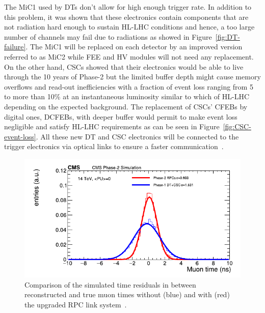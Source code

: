 	The \acf{MiC1} used by DTs don't allow for high enough trigger rate. In addition to this problem, it was shown that these electronics contain components that are not radiation hard enough to sustain HL-LHC conditions and hence, a too large number of channels may fail due to radiations as showed in Figure~\ref{fig:DT-failure}. The MiC1 will be replaced on each detector by an improved version referred to as MiC2 while \acf{FEE} and \acf{HV} modules will not need any replacement. On the other hand, CSCs showed that their electronics would be able to live through the 10 years of Phase-2 but the limited buffer depth might cause memory overflows and read-out inefficiencies with a fraction of event loss ranging from 5 to more than 10\% at an instantaneous luminosity similar to which of HL-LHC depending on the expected background. The replacement of CSCs' CFEBs by digital ones, DCFEBs, with deeper buffer would permit to make event loss negligible and satisfy HL-LHC requirements as can be seen in Figure~\ref{fig:CSC-event-loss}. All these new DT and CSC electronics will be connected to the trigger electronics via optical links to ensure a faster communication~\cite{PHASEIITP}.
	
\endgroup

\begingroup\setlength{\intextsep}{0pt}\setlength{\columnsep}{15pt}

	\begin{figure}
		\centering
		\includegraphics[width=\linewidth]{fig/chapt3/RPC-ugrade-LS.pdf}
		\caption{\label{fig:RPC-time} Comparison of the simulated time residuals in between reconstructed and true muon times without (blue) and with (red) the upgraded RPC link system~\cite{PHASEIITP}.}
	\end{figure}
	

